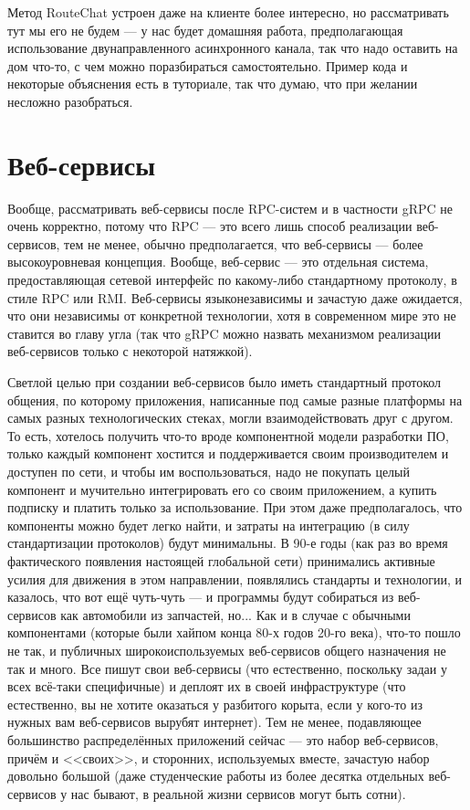 \documentclass[a5paper]{article}
\begin{document}
Метод RouteChat устроен даже на клиенте более интересно, но рассматривать тут мы его не будем --- у нас будет домашняя работа, предполагающая использование двунаправленного асинхронного канала, так что надо оставить на дом что-то, с чем можно поразбираться самостоятельно. Пример кода и некоторые объяснения есть в туториале, так что думаю, что при желании несложно разобраться.

\section{Веб-сервисы}

Вообще, рассматривать веб-сервисы после RPC-систем и в частности gRPC не очень корректно, потому что RPC --- это всего лишь способ реализации веб-сервисов, тем не менее, обычно предполагается, что веб-сервисы --- более высокоуровневая концепция. Вообще, веб-сервис --- это отдельная система, предоставляющая сетевой интерфейс по какому-либо стандартному протоколу, в стиле RPC или RMI. Веб-сервисы языконезависимы и зачастую даже ожидается, что они независимы от конкретной технологии, хотя в современном мире это не ставится во главу угла (так что gRPC можно назвать механизмом реализации веб-сервисов только с некоторой натяжкой). 

Светлой целью при создании веб-сервисов было иметь стандартный протокол общения, по которому приложения, написанные под самые разные платформы на самых разных технологических стеках, могли взаимодействовать друг с другом. То есть, хотелось получить что-то вроде компонентной модели разработки ПО, только каждый компонент хостится и поддерживается своим производителем и доступен по сети, и чтобы им воспользоваться, надо не покупать целый компонент и мучительно интегрировать его со своим приложением, а купить подписку и платить только за использование. При этом даже предполагалось, что компоненты можно будет легко найти, и затраты на интеграцию (в силу стандартизации протоколов) будут минимальны. В 90-е годы (как раз во время фактического появления настоящей глобальной сети) принимались активные усилия для движения в этом направлении, появлялись стандарты и технологии, и казалось, что вот ещё чуть-чуть --- и программы будут собираться из веб-сервисов как автомобили из запчастей, но... Как и в случае с обычными компонентами (которые были хайпом конца 80-х годов 20-го века), что-то пошло не так, и публичных широкоиспользуемых веб-сервисов общего назначения не так и много. Все пишут свои веб-сервисы (что естественно, поскольку задаи у всех всё-таки специфичные) и деплоят их в своей инфраструктуре (что естественно, вы не хотите оказаться у разбитого корыта, если у кого-то из нужных вам веб-сервисов вырубят интернет). Тем не менее, подавляющее большинство распределённых приложений сейчас --- это набор веб-сервисов, причём и <<своих>>, и сторонних, используемых вместе, зачастую набор довольно большой (даже студенческие работы из более десятка отдельных веб-сервисов у нас бывают, в реальной жизни сервисов могут быть сотни).
\end{document}
